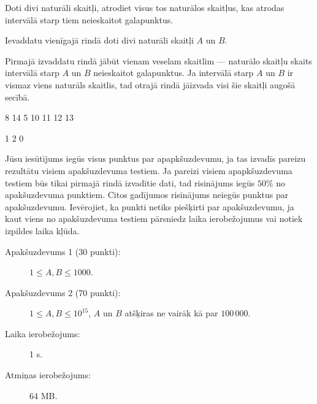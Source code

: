 \documentclass{boi2014-lv}
\begin{document}
    Doti divi naturāli skaitļi, atrodiet visus tos naturālos skaitļus, kas atrodas intervālā starp tiem neieskaitot galapunktus.

    \Input
    Ievaddatu vienīgajā rindā doti divi naturāli skaitļi $A$ un $B$.

    \Output
		Pirmajā izvaddatu rindā jābūt vienam veselam skaitlim --- naturālo skaitļu skaits intervālā starp $A$ un $B$ neieskaitot galapunktus. Ja intervālā starp $A$ un $B$ ir vismaz viens naturāls skaitlis, tad otrajā rindā jāizvada visi šie skaitļi augošā secībā.
    
    \Examples

    \simpleexample
    {
        8 14
    }
    {
        5  10 11 12 13
    }

    \simpleexample
    {
        1 2
    }
    {
        0
    }

    \Scoring

				Jūsu iesūtījums iegūs visus punktus par apapkšuzdevumu, ja tas izvadīs pareizu rezultātu visiem apakšuzdevuma testiem. Ja pareizi visiem apapkšuzdevuma testiem būs tikai pirmajā rindā izvadītie dati, tad risinājums iegūs $50\%$ no apakšuzdevuma punktiem. Citos gadījumos risinājums neiegūs punktus par apakšuzdevumu.
				Ievērojiet, ka punkti netiks piešķirti par apakšuzdevumu, ja kaut viens no apakšuzdevuma testiem pārsniedz laika ierobežojumus vai notiek izpildes laika kļūda.

    \begin{description}

        \item[Apakšuzdevums 1 (30 punkti):] $1 \le A, B \le 1000$. 
        \item[Apakšuzdevums 2 (70 punkti):] $1 \le A, B \le 10^{15}$,
            $A$ un $B$ atšķiras ne vairāk kā par $100\,000$.
    \end{description}

    \Constraints

    \begin{description}
        \item[Laika ierobežojums:] 1 s.
        \item[Atmiņas ierobežojums:] 64 MB.
    \end{description}
\end{document}

